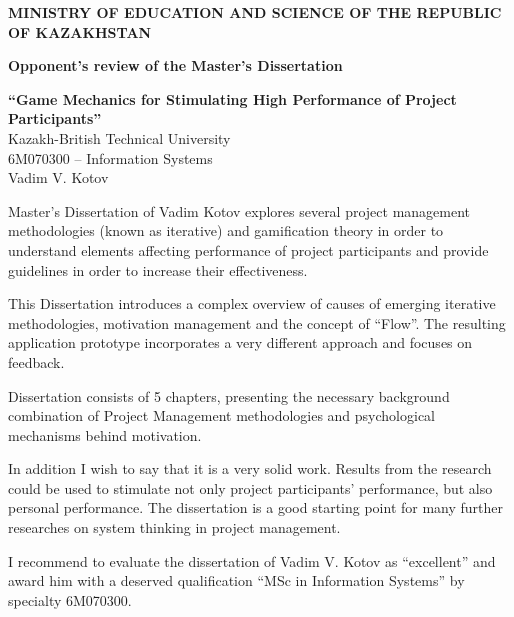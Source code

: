 \pagebreak
\thispagestyle{empty}
 \begin{centering}
        {\bf{\MakeUppercase{Ministry of education and science of the republic of Kazakhstan}}}

       \vspace{14pt}

        {\bf
        Opponent's review of the Master's Dissertation\\
        }

        \vspace{14pt}
        
        {\bf``Game Mechanics for Stimulating High Performance of Project Participants''}\\
        {\small Kazakh-British Technical University\\
        6M070300 -- Information Systems\\
        Vadim V. Kotov\\}
        
        \vspace{14pt}
        
    \end{centering}
    
    Master's Dissertation of Vadim Kotov explores several project management methodologies (known as iterative) and gamification theory in order to understand elements affecting performance of project participants and provide guidelines in order to increase their effectiveness.
    
    This Dissertation introduces a complex overview of causes of emerging iterative methodologies, motivation management and the concept of ``Flow''. The resulting application prototype incorporates a very different approach and focuses on feedback.
    
    Dissertation consists of 5 chapters, presenting the necessary background combination of Project Management methodologies and psychological mechanisms behind motivation.
    
    In addition I wish to say that it is a very solid work. Results from the research could be used to stimulate not only project participants' performance, but also personal performance. The dissertation is a good starting point for many further researches on system thinking in project management.
    
    I recommend to evaluate the dissertation of Vadim V. Kotov as ``excellent'' and award him with a deserved qualification ``MSc in Information Systems'' by specialty 6M070300.

